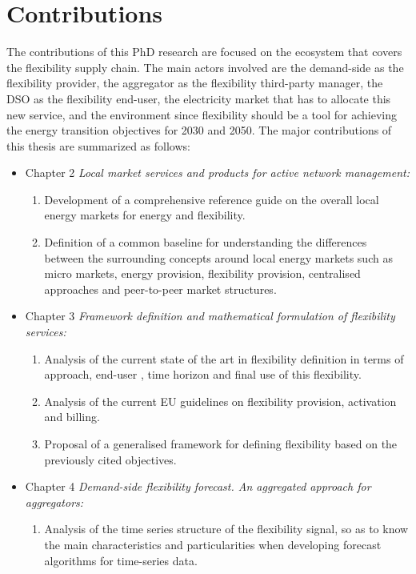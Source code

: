 \section{Contributions}
The contributions of this PhD research are focused on the ecosystem that covers the flexibility supply chain. The main actors involved are the demand-side as the flexibility provider, the aggregator as the flexibility third-party manager, the DSO as the flexibility end-user, the electricity market that has to allocate this new service, and the environment since flexibility should be a tool for achieving the energy transition objectives for 2030 and 2050. The major contributions of this thesis are summarized as follows:  
\begin{itemize}
\item Chapter 2 \textit{Local market services and products for active network management:} 
	\begin{enumerate}
		\item Development of a comprehensive reference guide on the overall local energy markets for energy and flexibility.
		\item Definition of a common baseline for understanding the differences between the surrounding concepts around local energy markets such as micro markets, energy provision, flexibility provision, centralised approaches and peer-to-peer market structures.  
	\end{enumerate}
\item Chapter 3 \textit{Framework definition and mathematical formulation of flexibility services:} 
	\begin{enumerate}
		\item Analysis of the current state of the art in flexibility definition in terms of approach, end-user , time horizon and final use of this flexibility. 
		\item Analysis of the current EU guidelines on flexibility provision, activation and billing. 
		\item Proposal of a generalised framework for defining flexibility based on the previously cited objectives. 
	\end{enumerate}
\item Chapter 4 \textit{Demand-side flexibility forecast. An aggregated approach for aggregators:} 
	\begin{enumerate}
		\item Analysis of the time series structure of the flexibility signal, so as to know the main characteristics and particularities when developing forecast algorithms for time-series data. 

\end{enumerate}
\end{itemize}
